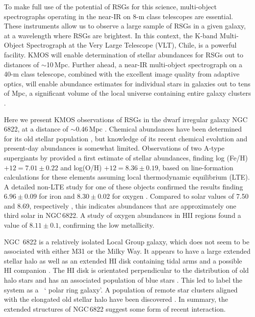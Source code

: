 \documentclass[iop]{emulateapj}
\begin{document}
To make full use of the potential of RSGs for this science, multi-object spectrographs operating in the near-IR on 8-m class telescopes are essential.
These instruments allow us to observe a large sample of RSGs in a given galaxy, at a wavelength where RSGs are brightest.
In this context, the K-band Multi-Object Spectrograph
\citep[KMOS;][]{2013Msngr.151...21S} at the Very Large Telescope (VLT), Chile, is a powerful facility.
KMOS will enable determination of stellar abundances for RSGs out to distances of $\sim$10\,Mpc.
Further ahead, a near-IR multi-object spectrograph on a 40-m class telescope, combined with the excellent image quality from adaptive optics,
will enable abundance estimates for individual stars in galaxies out to tens of Mpc,
a significant volume of the local universe containing entire galaxy clusters
\citep{2011A&A...527A..50E}.

Here we present KMOS observations of RSGs in the dwarf irregular galaxy NGC\,6822,
at a distance of $\sim$0.46\,Mpc
\citep[][and references therein]{2012AJ....144....4M}.
Chemical abundances have been determined for its old stellar population
\citep[e.g.][]{2001MNRAS.327..918T,2013ApJ...779..102K},
but knowledge of its recent chemical evolution and present-day abundances is
somewhat limited.
Observations of two A-type supergiants by
\cite{2001ApJ...547..765V} provided a first estimate of stellar abundances, finding
log (Fe/H) $+12=7.01\pm0.22$ and
log(O/H)   $+12=8.36\pm0.19$, based on line-formation calculations for these elements
assuming local thermodynamic equilibrium (LTE).
A detailed non-LTE study for one of these objects confirmed the results finding
$6.96\pm 0.09$ for iron and $8.30\pm0.02$ for oxygen
\citep{Przybilla02}.
Compared to solar values of 7.50 and 8.69, respectively
\citep{2009ARA&A..47..481A},
this indicates abundances that are approximately one third solar in NGC\,6822.
A study of oxygen abundances in HII regions
\citep{2006ApJ...642..813L} found a value of $8.11\pm0.1$, confirming the low metallicity.

NGC\, 6822 is a relatively isolated Local Group galaxy, which does not seem to be associated with either M31 or the Milky Way.
It appears to have a large extended stellar halo
\citep{2002AJ....123..832L,2014ApJ...783...49H}
as well as an extended HI disk containing tidal arms and a possible HI companion
\citep{2000ApJ...537L..95D}.
The HI disk is orientated perpendicular to the distribution of old halo stars and has an associated population of blue stars
\citep{2003MNRAS.341L..39D,2003ApJ...590L..17K}.
This led \cite{2006ApJ...636L..85D} to label the system as a
~\textquoteleft
polar ring galaxy\textquoteright.
A population of remote star clusters aligned with the elongated old stellar halo have been discovered
\citep{2011ApJ...738...58H,2013MNRAS.429.1039H}.
In summary, the extended structures of NGC\,6822 suggest some form of recent interaction.
\end{document}
